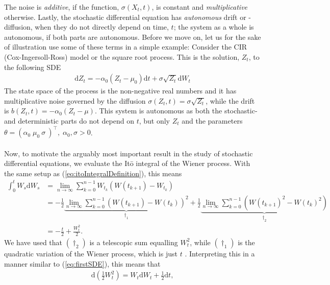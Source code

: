 The noise is \textit{additive}, if the function, $\sigma(X_t, t)$, is constant and \textit{multiplicative} otherwise. Lastly, the stochastic differential equation has \textit{autonomous} drift or -diffusion, when they do not directly depend on time, $t$; the system as a whole is autonomous, if both parts are autonomous. Before we move on, let us for the sake of illustration use some of these terms in a simple example: Consider the CIR (Cox-Ingersoll-Ross) model or the square root process. This is the solution, $Z_t$, to the following SDE
\begin{align}
    \mathrm{d}Z_t = -\alpha_0\left(Z_t - \mu_0\right)\mathrm{d}t + \sigma\sqrt{Z_t}\mathrm{d}W_t \label{eq:CIR_process}
\end{align}
The state space of the process is the non-negative real numbers and it has multiplicative noise governed by the diffusion $\sigma\left(Z_t, t\right) = \sigma\sqrt{Z_t}$, while the drift is $b(Z_t, t) = -\alpha_0\left(Z_t - \mu\right)$. This system is autonomous as both the stochastic- and deterministic parts do not depend on $t$, but only $Z_t$ and the parameters  $\theta = \left(\alpha_0\; \mu_0\: \sigma\:\right)^\top,\; \alpha_0, \sigma>0$.\\\\
Now, to motivate the arguably most important result in the study of stochastic differential equations, we evaluate the Itō integral of the Wiener process. With the same setup as (\ref{eq:itoIntegralDefinition}), this means
\begin{align}
    \int_0^t W_s \mathrm{d}W_s & = \lim_{n \to \infty}\sum_{k = 0}^{n-1} W_{t_k}\left(W(t_{k + 1}) - W_{t_k}\right) \nonumber \\ 
    & = - \frac{1}{2}\underbrace{\lim_{n \to \infty}\sum_{k = 0}^{n-1} \left(W(t_{k + 1}) - W(t_{k})\right)^2}_{\dagger_1}  + \frac{1}{2}\underbrace{\lim_{n \to \infty}\sum_{k = 0}^{n-1}\left(W(t_{k + 1})^2 - W(t_{k})^2\right)}_{\dagger_2} \nonumber \\
    & = -\frac{t}{2} + \frac{W_t^2}{2}.
\end{align}
We have used that $(\dagger_2)$ is a telescopic sum equalling $W_t^2$, while $(\dagger_1)$ is the quadratic variation of the Wiener process, which is just $t$ \cite[theorem 11.34]{Hansen2022}. Interpreting this in a manner similar to (\ref{eq:firstSDE}), this means that
\begin{align}
    \mathrm{d}\left(\frac{1}{2}W_t^2\right) = W_t\mathrm{d}W_t + \frac{1}{2}\mathrm{d}t, \label{eq:BrownianMotionDerivative}
\end{align}
